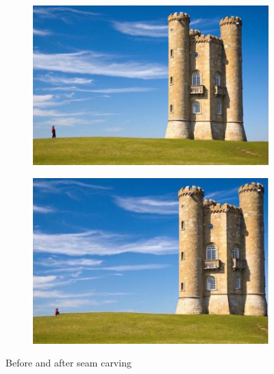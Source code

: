 \documentclass[12pt]{article}
\begin{document}
\begin{figure}
    \begin{subfigure}[t]{.49\textwidth}
        \centering
        \includegraphics[width=\linewidth]{carving_original}
    \end{subfigure}\hfill
    \begin{subfigure}[t]{.47\textwidth}
        \centering
        \includegraphics[width=\linewidth]{carving_50_100}
    \end{subfigure}
    \caption{Before and after seam carving}
    \label{fig_carve}
\end{figure}
\end{document}

